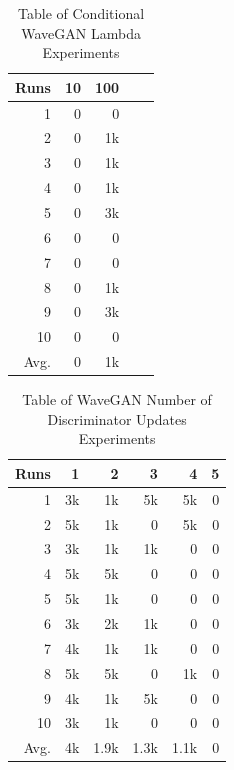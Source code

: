 \documentclass[a4paper, titlepage]{article}
\begin{document}
\begin{appendices}
\begin{table}[ht]
  \end{table}

  \begin{table}[ht]
    
    \caption{Table of Conditional WaveGAN Lambda Experiments}
    \label{tab:CWGAN_LAM}
    
    \begin{center}
      \begin{tabular}{ r | r | r | r | r }
        
        Runs & 10 & 100 \\
        \hline
        1 & 0 & 0 \\
        2 & 0 & 1k \\
        3 & 0 & 1k \\
        4 & 0 & 1k \\
        5 & 0 & 3k \\
        6 & 0 & 0 \\
        7 & 0 & 0 \\
        8 & 0 & 1k \\
        9 & 0 & 3k \\
        10 & 0 & 0 \\
        \hline
        Avg. & 0 & 1k \\
        
      \end{tabular}
    \end{center}
    
  \end{table}

  \begin{table}[ht]

  \caption{Table of WaveGAN Number of Discriminator Updates Experiments}
    \label{tab:WGAN_Ds}
    
    \begin{center}
      \begin{tabular}{ r | r | r | r | r | r }
        
        Runs & 1 & 2 & 3 & 4 & 5 \\
        \hline
        1 & 3k & 1k & 5k & 5k & 0 \\
        2 & 5k & 1k & 0 & 5k & 0 \\
        3 & 3k & 1k & 1k & 0 & 0 \\
        4 & 5k & 5k & 0 & 0 & 0 \\
        5 & 5k & 1k & 0 & 0 & 0 \\
        6 & 3k & 2k & 1k & 0 & 0 \\
        7 & 4k & 1k & 1k & 0 & 0 \\
        8 & 5k & 5k & 0 & 1k & 0 \\
        9 & 4k & 1k & 5k & 0 & 0 \\
        10 & 3k & 1k & 0 & 0 & 0 \\
        \hline
        Avg. & 4k & 1.9k & 1.3k & 1.1k & 0 \\
        

\end{tabular}
\end{center}
\end{table}
\end{appendices}
\end{document}
